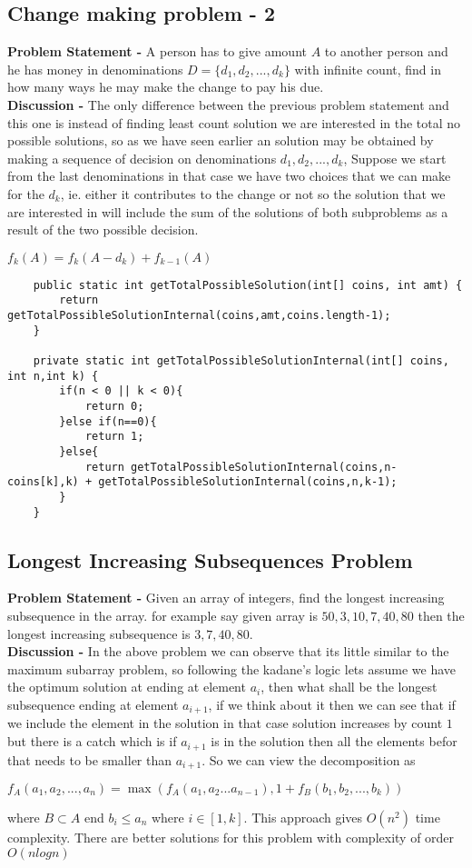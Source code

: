 \documentclass[10pt,a4paper,draft]{article}
\begin{document}
\subsection{Change making problem - 2}
\textbf{Problem Statement -} A person has to give amount $A$ to another person and he has money in denominations $D = \{d_1,d_2,...,d_k\}$ with infinite count, find in how many ways he may make the change to pay his due.
\\[12pt]
\textbf{Discussion -} The only difference between the previous problem statement and this one is instead of finding least count solution we are interested in the total no possible solutions, so as we have seen earlier an solution may be obtained by making a sequence of decision on denominations $d_1,d_2,...,d_k$, Suppose we start from the last denominations in that case we have two choices that we can make for the $d_k$, ie. either it contributes to the change or not so the solution that we are interested in will include the sum of the solutions of both subproblems as a result of the two possible decision.
\begin{center}
$f_k(A)=f_k(A-d_k) + f_{k-1}(A)$
\end{center}
\begin{lstlisting}
	public static int getTotalPossibleSolution(int[] coins, int amt) {
		return getTotalPossibleSolutionInternal(coins,amt,coins.length-1);
	}

	private static int getTotalPossibleSolutionInternal(int[] coins, int n,int k) {
		if(n < 0 || k < 0){
			return 0;
		}else if(n==0){
			return 1;
		}else{
			return getTotalPossibleSolutionInternal(coins,n-coins[k],k) + getTotalPossibleSolutionInternal(coins,n,k-1);
		}
	}
\end{lstlisting}
\subsection{Longest Increasing Subsequences Problem} 
\textbf{Problem Statement -} Given an array of integers, find the longest increasing subsequence in the array. for example say given array is ${50, 3, 10, 7, 40, 80}$ then the longest increasing subsequence is ${3, 7, 40, 80}$.
\\[12pt]
\textbf{Discussion -} In the above problem we can observe that its little similar to the maximum subarray problem, so following the kadane's logic lets assume we have the optimum solution at ending at element $a_i$, then what shall be the longest subsequence ending at element $a_{i+1}$, if we think about it then we can see that if we include the element in the solution in that case solution increases by count $1$ but there is a catch which is if $a_{i+1}$ is in the solution then all the elements befor that needs to be smaller than $a_{i+1}$. So we can view the decomposition as
\begin{center}
$f_A(a_1,a_2,...,a_n) = \max(f_A(a_1,a_2...a_{n-1}),1+f_B(b_1,b_2,...,b_k))$ 
\end{center}
where $B \subset A$ end $b_i \leq a_n$ where $i \in [1,k]$. This approach gives $O(n^2)$ time complexity. There are better solutions for this problem with complexity of order $O(nlogn)$
\end{document}
